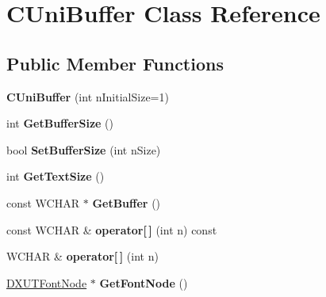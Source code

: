 \hypertarget{class_c_uni_buffer}{\section{C\+Uni\+Buffer Class Reference}
\label{class_c_uni_buffer}
}
\subsection*{Public Member Functions}
\begin{DoxyCompactItemize}
\item 
\hypertarget{class_c_uni_buffer_af89473fb3587314c4b3d773f0ed4fde1}{{\bfseries C\+Uni\+Buffer} (int n\+Initial\+Size=1)}\label{class_c_uni_buffer_af89473fb3587314c4b3d773f0ed4fde1}

\item 
\hypertarget{class_c_uni_buffer_acba24481f6d469d762e0c39f31eba80d}{int {\bfseries Get\+Buffer\+Size} ()}\label{class_c_uni_buffer_acba24481f6d469d762e0c39f31eba80d}

\item 
\hypertarget{class_c_uni_buffer_ac1584ce27e2969eb9a33159a15d0b1e6}{bool {\bfseries Set\+Buffer\+Size} (int n\+Size)}\label{class_c_uni_buffer_ac1584ce27e2969eb9a33159a15d0b1e6}

\item 
\hypertarget{class_c_uni_buffer_a2e50dad415c9fa8ef56926b76500f7a3}{int {\bfseries Get\+Text\+Size} ()}\label{class_c_uni_buffer_a2e50dad415c9fa8ef56926b76500f7a3}

\item 
\hypertarget{class_c_uni_buffer_a0a2a93af329ebeedcea0cf67b166fd8f}{const W\+C\+H\+A\+R $\ast$ {\bfseries Get\+Buffer} ()}\label{class_c_uni_buffer_a0a2a93af329ebeedcea0cf67b166fd8f}

\item 
\hypertarget{class_c_uni_buffer_a1d875e8c38094170c15cb551817bbedf}{const W\+C\+H\+A\+R \& {\bfseries operator\mbox{[}$\,$\mbox{]}} (int n) const }\label{class_c_uni_buffer_a1d875e8c38094170c15cb551817bbedf}

\item 
\hypertarget{class_c_uni_buffer_ae763d81a4be9f18f82dcf389184892b7}{W\+C\+H\+A\+R \& {\bfseries operator\mbox{[}$\,$\mbox{]}} (int n)}\label{class_c_uni_buffer_ae763d81a4be9f18f82dcf389184892b7}

\item 
\hypertarget{class_c_uni_buffer_a8c781a0b6673cb2e1c0fd67e9bdcebb5}{\hyperlink{struct_d_x_u_t_font_node}{D\+X\+U\+T\+Font\+Node} $\ast$ {\bfseries Get\+Font\+Node} ()}\label{class_c_uni_buffer_a8c781a0b6673cb2e1c0fd67e9bdcebb5}


\end{DoxyCompactItemize}
